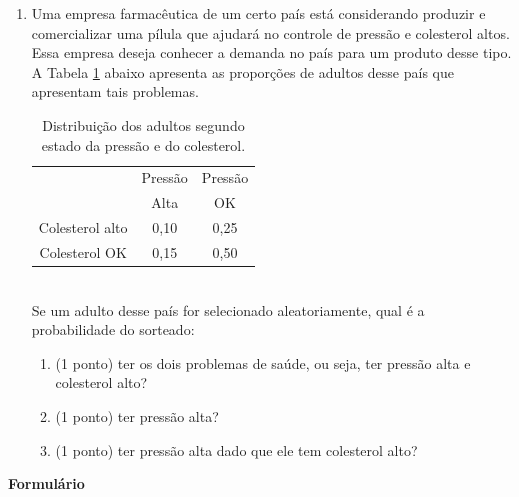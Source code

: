 \documentclass{article}
\begin{document}
\begin{enumerate}
\item Uma empresa farmacêutica de um certo país está considerando produzir e comercializar uma pílula que ajudará no controle de pressão e colesterol altos. 
Essa empresa deseja conhecer a demanda no país para um produto desse tipo. 
A Tabela \ref{t:pressao_colesterol} abaixo apresenta as proporções de adultos desse país que apresentam tais problemas.
\begin{table}[htp]
\centering
\caption{Distribuição dos adultos segundo estado da pressão e do colesterol.}
\begin{tabular}{c|cc}
\hline
  & Pressão & Pressão  \\
 & Alta & OK \\
\hline
Colesterol alto & 0,10 & 0,25 \\
Colesterol OK   & 0,15 & 0,50 \\
\hline
\end{tabular}
\label{t:pressao_colesterol}
\end{table}\\
Se um adulto desse país for selecionado aleatoriamente, qual é a probabilidade do sorteado:
\begin{enumerate}
	\item (1 ponto) ter os dois problemas de saúde, ou seja, ter pressão alta e colesterol alto?
	\item (1 ponto) ter pressão alta?
	\item (1 ponto) ter pressão alta dado que ele tem colesterol alto?
\end{enumerate}

\end{enumerate}



\vspace{2cm}

\begin{center}
	\Large{\textbf{Formulário}}
\end{center}
\end{document}
